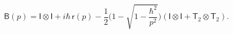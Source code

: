\begin{equation}
\mathsf{B}(p)= \mathsf{I \otimes I} + i\hbar \,\mathsf{r}(p) -
\frac{1}{2}\bigg( 1- \sqrt{1-\frac{\hbar^2}{p^2}}\bigg)(\mathsf{I \otimes I} +
\mathsf{T}_2 \otimes \mathsf{T}_2). \label{brad}
\end{equation}

